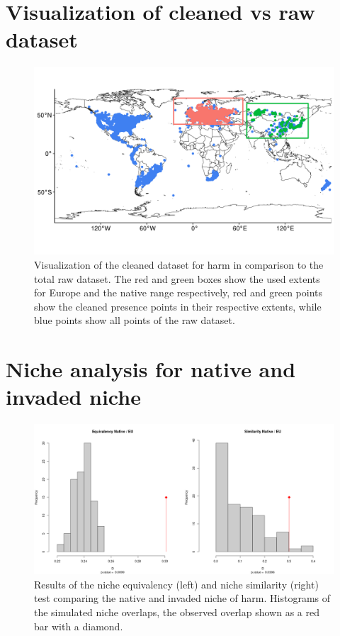 \newpage
\appendix

\section{Visualization of cleaned vs raw dataset}

\begin{figure}[!h]
    \centering
    \includegraphics[width = 0.9\linewidth]{"../../R/figures/raw-vs-cleaned-glob.png"}
    \caption{\label{fig:raw_vs_cleaned_glob} Visualization of the cleaned dataset for \gls{harm} in comparison to the total raw dataset. The red and green boxes show the used extents for Europe and the native range respectively, red and green points show the cleaned presence points in their respective extents, while blue points show all points of the raw dataset.}
\end{figure}

\section{Niche analysis for native and invaded niche}

\begin{figure}[!h]
    \centering
    \includegraphics[width = \linewidth]{"../../R/figures/as-eu-tot-eq-sim.png"}
    \caption{\label{fig:as_eu_eq_sim} Results of the niche equivalency (left) and niche similarity (right) test comparing the native and invaded niche of \gls{harm}. Histograms of the simulated niche overlaps, the observed overlap shown as a red bar with a diamond.}
\end{figure}

